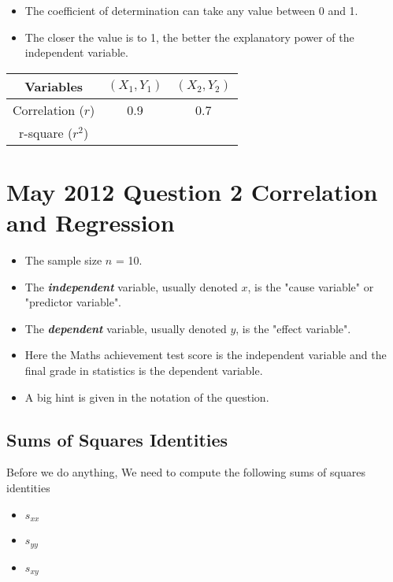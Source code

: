 \documentclass[]{report}
\begin{document}



\begin{itemize}
	\item The coefficient of determination can take any value between 0 and 1.
	\item The closer the value is to 1, the better the explanatory power of the independent variable.
\end{itemize}

\begin{tabular}{|c|c|c|}
	\hline Variables & $(X_1,Y_1)$ & $(X_2,Y_2)$ \\ 
	\hline Correlation ($r$) & 0.9 & 0.7 \\ 
	\hline r-square ($r^2$) &  &  \\ 
	\hline 
\end{tabular} 

\newpage

\section*{May 2012 Question 2 Correlation and Regression}
\begin{itemize}
	\item The sample size $n$ = 10.
	\item The \textbf{\textit{independent}} variable, usually denoted $x$, is the "cause variable" or "predictor variable".
	\item The \textbf{\textit{dependent}} variable, usually denoted $y$, is the "effect variable".
	\item Here the Maths achievement test score is the independent variable and the final grade in statistics is the dependent variable.
	\item A big hint is given in the notation of the question.
\end{itemize}


\subsection*{Sums of Squares Identities}
Before we do anything, We need to compute the following sums of squares identities
\begin{itemize}
	\item $s_{xx}$
	\item $s_{yy}$
	\item $s_{xy}$
\end{itemize}
\end{document}
